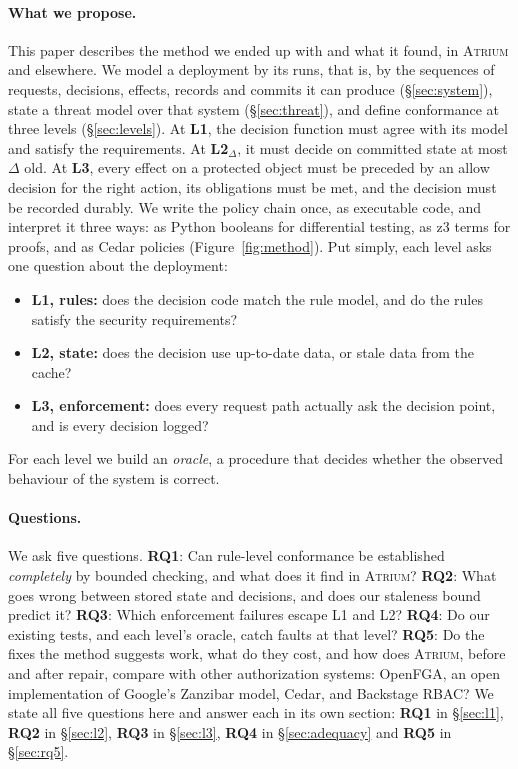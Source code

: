 \documentclass[sigconf,review,anonymous]{acmart}
\newcommand{\sysname}{\textsc{Atrium}\xspace}
\newcommand{\sysname}{\textsc{OpenZTAC}\xspace}
\newcommand{\RQ}[1]{\textbf{RQ#1}}
\begin{document}
\paragraph{What we propose.} This paper describes the method we ended up with and what it found, in
\sysname and elsewhere. We model a deployment by its runs, that is, by the sequences of requests,
decisions, effects, records and commits it can produce (\S\ref{sec:system}), state a threat model over that system (\S\ref{sec:threat}),
and define conformance at three levels (\S\ref{sec:levels}). At \textbf{L1}, the decision function must agree
with its model and satisfy the requirements. At \textbf{L2$_\Delta$}, it must decide on committed state at
most $\Delta$ old. At \textbf{L3}, every effect on a protected object must be preceded by an allow decision
for the right action, its obligations must be met, and the decision must be recorded durably. We write the
policy chain once, as executable code, and interpret it three ways: as Python booleans for differential
testing, as z3 terms for proofs, and as Cedar policies (Figure~\ref{fig:method}).
Put simply, each level asks one question about the deployment:
\begin{itemize}
\item \textbf{L1, rules:} does the decision code match the rule model, and do the rules satisfy the security
requirements?
\item \textbf{L2, state:} does the decision use up-to-date data, or stale data from the cache?
\item \textbf{L3, enforcement:} does every request path actually ask the decision point, and is every decision
logged?
\end{itemize}
For each level we build an \emph{oracle}, a procedure that decides whether the observed behaviour of the system
is correct.

\paragraph{Questions.} We ask five questions. \RQ1: Can rule-level conformance be established
\emph{completely} by bounded checking, and what does it find in \sysname? \RQ2: What goes wrong between stored
state and decisions, and does our staleness bound predict it? \RQ3: Which enforcement failures escape L1 and
L2? \RQ4: Do our existing tests, and each level's oracle, catch faults at that level? \RQ5: Do the fixes the
method suggests work, what do they cost, and how does \sysname, before and after repair, compare with other
authorization systems: OpenFGA, an open implementation of Google's Zanzibar model, Cedar, and Backstage RBAC?
We state all five questions here and answer each in its own section: \RQ1 in \S\ref{sec:l1}, \RQ2 in
\S\ref{sec:l2}, \RQ3 in \S\ref{sec:l3}, \RQ4 in \S\ref{sec:adequacy} and \RQ5 in \S\ref{sec:rq5}.
\end{document}
